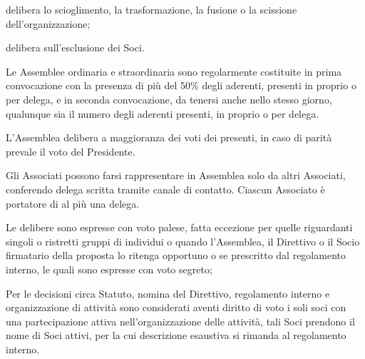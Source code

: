 \documentclass[legalpaper, 11pt]{exam}
\let\tempone\enumerate
\let\temptwo\endenumerate
\renewenvironment{enumerate}{\tempone\addtolength{\itemsep}{-0.45\baselineskip}}{\temptwo}
\begin{document}
{\begin{enumerate}
\begin{enumerate}
  \item delibera lo scioglimento, la trasformazione, la fusione o la scissione dell’organizzazione;
  \item delibera sull’esclusione dei Soci.
 \end{enumerate}
 \item Le Assemblee ordinaria e straordinaria sono regolarmente costituite in prima convocazione con la presenza di più del 50\% degli aderenti, presenti in proprio o per delega, e in seconda convocazione, da tenersi anche nello stesso giorno, qualunque sia il numero degli aderenti presenti, in proprio o per delega.
 \item L’Assemblea delibera a maggioranza dei voti dei presenti, in caso di parità prevale il voto del Presidente.
 \item Gli Associati possono farsi rappresentare in Assemblea solo da altri Associati, conferendo delega scritta tramite canale di contatto. Ciascun Associato è portatore di al più una delega.
 \item Le delibere sono espresse con voto palese, fatta eccezione per quelle riguardanti singoli o ristretti gruppi di individui o quando l’Assemblea, il Direttivo o il Socio firmatario della proposta lo ritenga opportuno o se prescritto dal regolamento interno, le quali sono espresse con voto segreto;
 \item Per le decisioni circa Statuto, nomina del Direttivo, regolamento interno e organizzazione di attività sono considerati aventi diritto di voto i soli soci con una partecipazione attiva nell’organizzazione delle attività, tali Soci prendono il nome di Soci attivi, per la cui descrizione esaustiva si rimanda al regolamento interno.
\end{enumerate}

}
\end{document}
